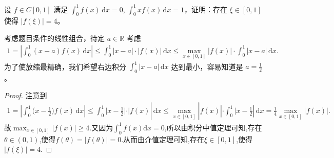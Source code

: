 \documentclass[../../main.tex]{subfiles}
\begin{document}
\begin{example}
设 $f \in C[0,1]$ 满足 $\int_0^1 f(x) \, \mathrm{d}x = 0$, $\int_0^1 xf(x) \, \mathrm{d}x = 1$，证明：存在 $\xi \in [0,1]$ 使得 $|f(\xi)| = 4$。
\end{example}
\begin{note}
考虑题目条件的线性组合，待定 $a \in \mathbb{R}$ 考虑
\begin{align*}
1 = \left| \int_0^1 (x - a)f(x) \, \mathrm{d}x \right| \leqslant  \int_0^1 |x - a| \cdot |f(x)| \, \mathrm{d}x \leqslant  \max_{x \in [0,1]} |f(x)| \cdot \int_0^1 |x - a| \, \mathrm{d}x.
\end{align*}
为了使放缩最精确，我们希望右边积分 $\int_0^1 |x - a| \, \mathrm{d}x$ 达到最小，容易知道是 $a = \frac{1}{2}$。
\end{note}
\begin{proof}
注意到
\begin{align*}
1=\left| \int_0^1{(x}-\frac{1}{2})f(x)\,\mathrm{d}x \right|\le \int_0^1{|x}-\frac{1}{2}|\cdot |f(x)|\,\mathrm{d}x\le \max_{x\in [0,1]} |f(x)|\cdot \int_0^1{|x}-\frac{1}{2}|\,\mathrm{d}x=\frac{1}{4}\max_{x\in [0,1]} |f(x)|.
\end{align*}
故$\max_{x\in [0,1]} |f(x)|\geqslant 4$.又因为$\int_0^1{f(x) \mathrm{d}x}=0$,所以由积分中值定理可知,存在$\theta \in (0,1)$,使得$f(\theta) =\left| f(\theta) \right|=0$.从而由介值定理可知,存在$\xi \in [0,1]$,使得$\left| f(\xi) \right|=4$.

\end{proof}
\end{document}
